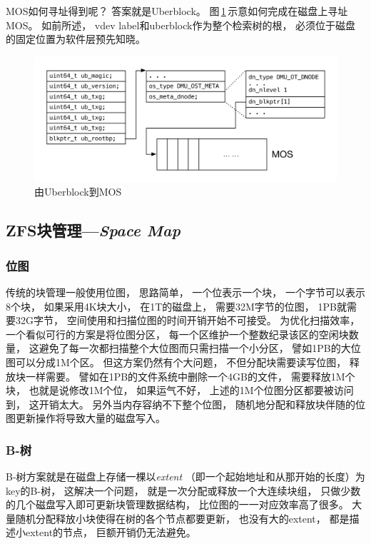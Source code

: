 MOS如何寻址得到呢？
答案就是Uberblock。
图\,\ref{fig:uber}\,示意如何完成在磁盘上寻址MOS。
如前所述，
vdev label和uberblock作为整个检索树的根，
必须位于磁盘的固定位置为软件层预先知晓。
\begin{figure}[!hb]
  \centering
  \includegraphics[width=.95\textwidth]{fig/zfs_uber_to_mos.pdf}
  \caption{由Uberblock到MOS}\label{fig:uber}
\end{figure}

\subsection{ZFS块管理---{\em Space Map}}
\subsubsection{位图}
传统的块管理一般使用位图，
思路简单，
一个位表示一个块，
一个字节可以表示8个块，
如果采用4K块大小，
在1T的磁盘上，
需要32M字节的位图，
1PB就需要32G字节，
空间使用和扫描位图的时间开销开始不可接受。
为优化扫描效率，
一个看似可行的方案是将位图分区，
每一个区维护一个整数纪录该区的空闲块数量，
这避免了每一次都扫描整个大位图而只需扫描一个小分区，
譬如1PB的大位图可以分成1M个区。
但这方案仍然有个大问题，
不但分配块需要读写位图，
释放块一样需要。
譬如在1PB的文件系统中删除一个4GB的文件，
需要释放1M个块，
也就是说修改1M个位，
如果运气不好，
上述的1M个位图分区都要被访问到，
这开销太大。
另外当内存容纳不下整个位图，
随机地分配和释放块伴随的位图更新操作将导致大量的磁盘写入。

\subsubsection{B-树}
B-树方案就是在磁盘上存储一棵以{\em extent}%
（即一个起始地址和从那开始的长度）为key的B-树，
这解决一个问题，
就是一次分配或释放一个大连续块组，
只做少数的几个磁盘写入即可更新块管理数据结构，
比位图的一一对应效率高了很多。
大量随机分配释放小块使得在树的各个节点都要更新，
也没有大的extent，
都是描述小extent的节点，
巨额开销仍无法避免。

